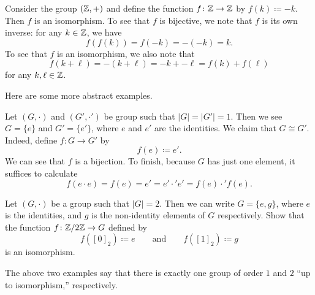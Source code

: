 \documentclass[../main.tex]{subfiles}
\begin{document}
\begin{example}
    Consider the group $(\mathbb Z,+)$ and define the function $f\colon\mathbb Z\to\mathbb Z$ by $f(k)\coloneqq-k$. Then $f$ is an isomorphism. To see that $f$ is bijective, we note that $f$ is its own inverse: for any $k\in\mathbb Z$, we have
    \[f(f(k))=f(-k)=-(-k)=k.\]
    To see that $f$ is an isomorphism, we also note that
    \[f(k+\ell)=-(k+\ell)=-k+-\ell=f(k)+f(\ell)\]
    for any $k,\ell\in\mathbb Z$.
\end{example}
Here are some more abstract examples.
\begin{example} \label{ex:groups-of-ord-1}
    Let $(G,\cdot)$ and $(G',\cdot')$ be group such that $|G|=|G'|=1$. Then we see $G=\{e\}$ and $G'=\{e'\}$, where $e$ and $e'$ are the identities. We claim that $G\cong G'$. Indeed, define $f\colon G\to G'$ by
    \[f(e)\coloneqq e'.\]
    We can see that $f$ is a bijection. To finish, because $G$ has just one element, it suffices to calculate
    \[f(e\cdot e)=f(e)=e'=e'\cdot'e'=f(e)\cdot'f(e).\]
\end{example}
\begin{exe} \label{exe:groups-of-order-2}
    Let $(G,\cdot)$ be a group such that $|G|=2$. Then we can write $G=\{e,g\}$, where $e$ is the identities, and $g$ is the non-identity elements of $G$ respectively. Show that the function $f\colon\mathbb Z/2\mathbb Z\to G$ defined by
    \[f([0]_2)\coloneqq e\qquad\text{and}\qquad f([1]_2)\coloneqq g\]
    is an isomorphism.
\end{exe}
The above two examples say that there is exactly one group of order $1$ and $2$ ``up to isomorphism,'' respectively.
\end{document}
